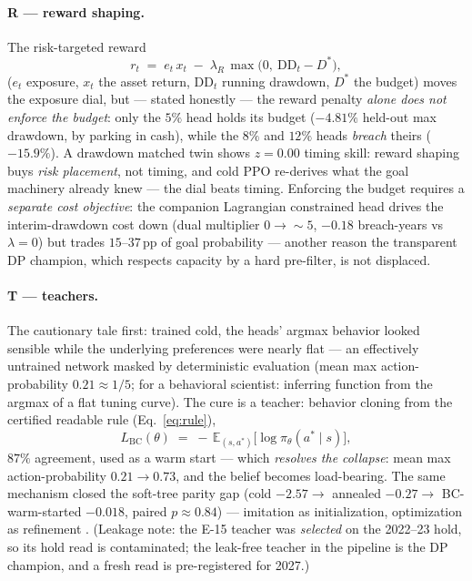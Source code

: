 \documentclass[11pt]{article}
\newcommand{\E}{\mathbb{E}}
\begin{document}
\paragraph{R --- reward shaping.} The risk-targeted reward
\begin{equation}
r_t \;=\; e_t\, x_t \;-\; \lambda_{R}\,\max\big(0,\ \text{DD}_t - D^{*}\big),
\label{eq:reward}
\end{equation}
($e_t$ exposure, $x_t$ the asset return, $\text{DD}_t$ running drawdown, $D^{*}$ the budget)
moves the exposure dial, but --- stated honestly --- the reward penalty \emph{alone does not
enforce the budget}: only the $5\%$ head holds its budget ($-4.81\%$ held-out max drawdown, by
parking in cash), while the $8\%$ and $12\%$ heads \emph{breach} theirs ($-15.9\%$). A drawdown
matched twin shows $z = 0.00$ timing skill: reward shaping buys \emph{risk placement}, not
timing, and cold PPO re-derives what the goal machinery already knew --- the dial beats timing.
Enforcing the budget requires a \emph{separate cost objective}: the companion Lagrangian
constrained head drives the interim-drawdown cost down (dual multiplier $0\to{\sim}5$,
$-0.18$ breach-years vs $\lambda{=}0$) but trades $15\text{--}37$\,pp of goal probability ---
another reason the transparent DP champion, which respects capacity by a hard pre-filter, is not
displaced.

\paragraph{T --- teachers.} The cautionary tale first: trained cold, the heads' argmax behavior
looked sensible while the underlying preferences were nearly flat --- an effectively untrained
network masked by deterministic evaluation (mean max action-probability $0.21 \approx 1/5$; for
a behavioral scientist: inferring function from the argmax of a flat tuning curve). The cure is
a teacher: behavior cloning from the certified readable rule (Eq.~\ref{eq:rule}),
\begin{equation}
L_{\text{BC}}(\theta) \;=\; -\,\E_{(s,a^{*})}\big[\log \pi_\theta(a^{*}\mid s)\big],
\label{eq:bc}
\end{equation}
$87\%$ agreement, used as a warm start --- which \emph{resolves the collapse}: mean max
action-probability $0.21 \to 0.73$, and the belief becomes load-bearing. The same mechanism
closed the soft-tree parity gap (cold $-2.57 \to$ annealed $-0.27 \to$ BC-warm-started $-0.018$,
paired $p\approx0.84$) --- imitation as initialization, optimization as refinement
\citep{ross2011dagger,rusu2016distillation}. (Leakage note: the E-15 teacher was \emph{selected}
on the 2022--23 hold, so its hold read is contaminated; the leak-free teacher in the pipeline is
the DP champion, and a fresh read is pre-registered for 2027.)
\end{document}
